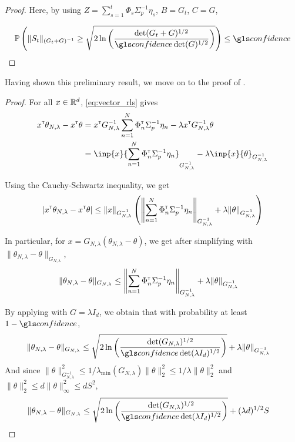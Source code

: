 \begin{subappendices}
\begin{proof}
		Here, by using $Z = \sum_{s=1}^t\Phi_s\Sigma_p^{-1}\eta_s$, $B=G_t$, $C=G$,
		
		\[
		\probability{\| S_t \|_{(G_t+G)^{-1}} \geq \sqrt{2\ln \left(\frac{\det(G_t+G)^{1/2}}{\confidence\det(G)^{1/2}}\right)}} \leq \confidence
		\]
		
	\end{proof}
	
	Having shown this preliminary result, we move on to the proof of .
	
	\begin{proof}
		For all $x\in\mathbb{R}^d$, \eqref{eq:vector_rls} gives
		\begin{align*}
		x^\transp\theta_{N,\lambda}  -x^\transp\theta &= x^\transp G_{N, \lambda}^{-1}\sum_{n=1}^N \Phi_n^\transp \Sigma_p^{-1}\eta_n
		- \lambda x^\transp G_{N, \lambda}^{-1}\theta\\
		&= \inp{x}{\sum_{n=1}^N \Phi_n^\transp \Sigma_p^{-1}\eta_n}_{G_{N, \lambda}^{-1}} - \lambda\inp{x}{\theta}_{G_{N, \lambda}^{-1}}
		\end{align*}
		
		Using the Cauchy-Schwartz inequality, we get
		\begin{align*}
		|x^{\mathsf{\scriptscriptstyle T}}\theta_{N,\lambda}  -x^{\mathsf{\scriptscriptstyle T}}\theta| \leq \|x\|_{G_{N, \lambda}^{-1}}\left(\left\|\sum_{n=1}^N \Phi_n^{\mathsf{\scriptscriptstyle T}} \Sigma_p^{-1}\eta_n\right\|_{G_{N, \lambda}^{-1}} + \lambda\|\theta\|_{G_{N, \lambda}^{-1}}\right)
		\end{align*}
		
		In particular, for $x = G_{N,\lambda}(\theta_{N,\lambda} - \theta)$, we get after simplifying with $\| \theta_{N,\lambda}  - \theta\|_{G_{N,\lambda}}$,
		\begin{align*}
		\| \theta_{N,\lambda}  - \theta\|_{G_{N,\lambda}} &\leq \left\|\sum_{n=1}^N \Phi_n^{\mathsf{\scriptscriptstyle T}} \Sigma_p^{-1}\eta_n\right\|_{G_{N, \lambda}^{-1}} + \lambda\|\theta\|_{G_{N, \lambda}^{-1}}
		\end{align*}
		
		By applying  with $G=\lambda I_d$, we obtain that with probability at least $1-\confidence$,
		\begin{align*}
		\| \theta_{N,\lambda}  - \theta\|_{G_{N,\lambda}} &\leq \sqrt{2\ln \left(\frac{\det(G_{N,\lambda})^{1/2}}{\confidence\det(\lambda I_d)^{1/2}}\right)}
		+ \lambda\|\theta\|_{G_{N, \lambda}^{-1}}
		\end{align*}
		And since $\|\theta\|_{G_{N, \lambda}^{-1}}^2 \leq 1/\lambda_{\min}(G_{N,\lambda})\|\theta\|_2^2 \leq 1/\lambda \|\theta\|_2^2$ and $\|\theta\|_2^2 \leq d\|\theta\|_\infty^2\leq d S^2$,
		\begin{align*}
		\| \theta_{N,\lambda}  - \theta\|_{G_{N,\lambda}} &\leq \sqrt{2\ln \left(\frac{\det(G_{N,\lambda})^{1/2}}{\confidence\det(\lambda I_d)^{1/2}}\right)}
		+ (\lambda d)^{1/2}S
		\end{align*}
	\end{proof}
	

\end{subappendices}
